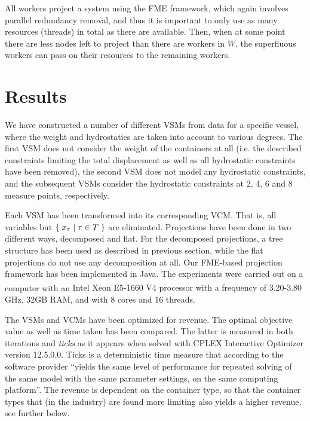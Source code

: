 \vspace{1mm}
All workers project a system using the FME framework, which again involves parallel redundancy removal, and thus it is important to only use as many resources (threads) in total as there are available.
Then, when at some point there are less nodes left to project than there are workers in $W$, the superfluous workers can pass on their resources to the remaining workers.  

\section{Results}\label{sec:results}
We have constructed a number of different VSMs from data for a specific vessel, where the weight and hydrostatics are taken into account to various degrees. The first VSM does not consider the weight of the containers at all (i.e. the described constraints limiting the total displacement as well as all hydrostatic constraints have been removed), the second VSM does not model any hydrostatic constraints, and the subsequent VSMs consider the hydrostatic constraints at 2, 4, 6 and 8 measure points, respectively.

Each VSM has been transformed into its corresponding VCM. That is, all variables but $\{\;{x_\tau}\;|\;{\tau\in T}\;\}$ are eliminated. Projections have been done in two different ways, decomposed and flat. For the decomposed projections, a tree structure has been used as described in previous section, while the flat projections do not use any decomposition at all. 
Our FME-based projection framework has been implemented in Java. The experiments were carried out on a computer with an {Intel\textsuperscript{\textregistered} Xeon\textsuperscript{\textregistered} E5-1660 V4 processor with a frequency of 3.20-3.80 GHz, 32GB RAM, and with 8 cores and 16 threads.}

The VSMs and VCMs have been optimized for revenue. The optimal objective value as well as time taken has been compared. The latter is measured in both iterations and \emph{ticks} as it appears when solved with CPLEX Interactive Optimizer version 12.5.0.0. Ticks is a deterministic time measure that according to the software provider ``yields the same level of performance for repeated solving of the same model with the same parameter settings, on the same computing platform''. The revenue is dependent on the container type, so that the container types that (in the industry) are found more limiting also yields a higher revenue, see further below. 

